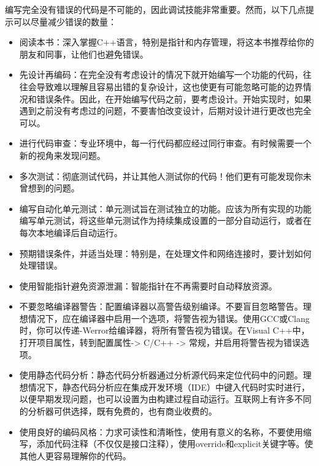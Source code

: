 编写完全没有错误的代码是不可能的，因此调试技能非常重要。然而，以下几点提示可以尽量减少错误的数量：

\begin{itemize}
\item
阅读本书：深入掌握C++语言，特别是指针和内存管理，将这本书推荐给你的朋友和同事，让他们也避免错误。

\item
先设计再编码：在完全没有考虑设计的情况下就开始编写一个功能的代码，往往会导致难以理解且容易出错的复杂设计，这也使更有可能忽略可能的边界情况和错误条件。因此，在开始编写代码之前，要考虑设计。开始实现时，如果遇到之前没有考虑过的问题，不要害怕改变设计，后期对设计进行更改也完全可以。

\item
进行代码审查：专业环境中，每一行代码都应经过同行审查。有时候需要一个新的视角来发现问题。

\item
多次测试：彻底测试代码，并让其他人测试你的代码！他们更有可能发现你未曾想到的问题。

\item
编写自动化单元测试：单元测试旨在测试独立的功能。应该为所有实现的功能编写单元测试，将这些单元测试作为持续集成设置的一部分自动运行，或者在每次本地编译后自动运行。

\item
预期错误条件，并适当处理：特别是，在处理文件和网络连接时，要计划如何处理错误。

\item
使用智能指针避免资源泄漏：智能指针在不再需要时自动释放资源。

\item
不要忽略编译器警告：配置编译器以高警告级别编译。不要盲目忽略警告。理想情况下，应在编译器中启用一个选项，将警告视为错误。使用GCC或Clang时，你可以传递-Werror给编译器，将所有警告视为错误。在Visual C++中，打开项目属性，转到配置属性-> C/C++ -> 常规，并启用将警告视为错误选项。

\item
使用静态代码分析：静态代码分析器通过分析源代码来定位代码中的问题。理想情况下，静态代码分析应在集成开发环境（IDE）中键入代码时实时进行，以便早期发现问题，也可以设置为由构建过程自动运行。互联网上有许多不同的分析器可供选择，既有免费的，也有商业收费的。

\item
使用良好的编码风格：力求可读性和清晰性，使用有意义的名称，不要使用缩写，添加代码注释（不仅仅是接口注释），使用override和explicit关键字等。使其他人更容易理解你的代码。
\end{itemize}